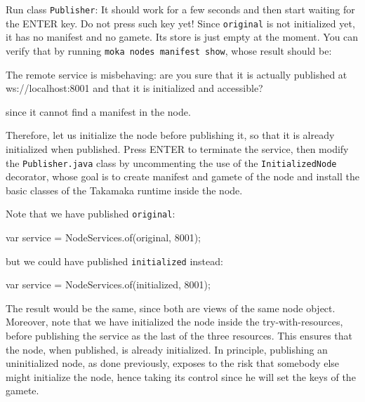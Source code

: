 Run class \texttt{Publisher}:
%
%
It should work for a few seconds and then start waiting for the ENTER key. Do not press such key yet!
Since \texttt{original} is not initialized yet, it has no manifest and no gamete. Its store is just empty
at the moment. You can verify that by running \texttt{moka nodes manifest show}, whose result should be:
%
\begin{shellbox}\begin{ttlst}
The remote service is misbehaving: are you sure that it is actually published at ws://localhost:8001 and that it is initialized and accessible?
\end{ttlst}\end{shellbox}
%
since it cannot find a manifest in the node.

Therefore, let us initialize the node before publishing it, so that it is already
initialized when published. Press ENTER to terminate the service, then modify
the \texttt{Publisher.java} class by uncommenting the use of the \texttt{InitializedNode} decorator,
whose goal is to create manifest and gamete of the node
and install the basic classes of the Takamaka runtime inside the node.
%
\begin{commentbox}
Note that we have published \texttt{original}:
%
\begin{codebox}\begin{javalst}
var service = NodeServices.of(original, 8001);
\end{javalst}\end{codebox}
%
but we could have published \texttt{initialized} instead:
%
\begin{codebox}\begin{javalst}
var service = NodeServices.of(initialized, 8001);
\end{javalst}\end{codebox}
%
The result would be the same, since both are views of the same node object.
Moreover, note that we have initialized the node inside the try-with-resources,
before publishing the service as the last of the three resources.
This ensures that the node, when published, is already initialized.
In principle, publishing an uninitialized node, as done previously, exposes
to the risk that somebody else might initialize the node, hence taking its control
since he will set the keys of the gamete.
\end{commentbox}

